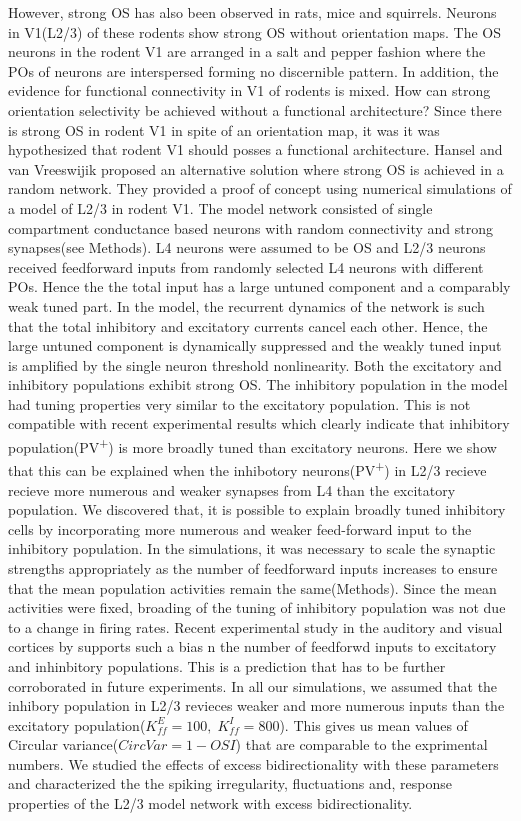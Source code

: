 However, strong OS has also been observed in rats, mice and squirrels. Neurons in V1(L2/3) of these rodents show strong OS without orientation maps. The OS neurons in the rodent V1 are arranged in a salt and pepper fashion where the POs of neurons are interspersed forming no discernible pattern. In addition, the evidence for functional connectivity in V1 of rodents is mixed. How can strong orientation selectivity be achieved without a functional architecture? Since there is strong OS in rodent V1 in spite of an orientation map, it was it was hypothesized that rodent V1 should posses a functional architecture. Hansel and van Vreeswijik \cite{Hansel2012} proposed an alternative solution where strong OS is achieved in a random network. They provided a proof of concept using numerical simulations of a model of L2/3 in rodent V1. The model network consisted of single compartment conductance based neurons with random connectivity and strong synapses(see Methods). L4 neurons were assumed to be OS and L2/3 neurons received feedforward inputs from randomly selected L4 neurons with different POs. Hence the the total input has a large untuned component and a comparably weak tuned part. In the model, the recurrent dynamics of the network is such that the total inhibitory and excitatory currents cancel each other. Hence, the large untuned component is dynamically suppressed and the weakly tuned input is amplified by the single neuron threshold nonlinearity. Both the excitatory and inhibitory populations exhibit strong OS. The inhibitory population in the model had tuning properties very similar to the excitatory population. This is not compatible with recent experimental results which clearly indicate that inhibitory population(PV\textsuperscript{+}) is more broadly tuned than excitatory neurons. Here we show that this can be explained when the inhibotory neurons(PV\textsuperscript{+}) in L2/3 recieve recieve more numerous and weaker synapses from L4 than the excitatory population.  We discovered that, it is possible to explain broadly tuned inhibitory cells by incorporating more numerous and weaker feed-forward input to the inhibitory population. In the simulations, it was necessary to scale the synaptic strengths appropriately as the number of feedforward inputs increases to ensure that the mean population activities remain the same(Methods). Since the mean activities were fixed, broading of the tuning of inhibitory population was not due to a change in firing rates. Recent experimental study in the auditory and visual cortices by \cite{} supports such a bias n the number of feedforwd inputs to excitatory and inhinbitory populations. This is a prediction that has to be further corroborated in future experiments. In all our simulations, we assumed that the inhibory population in L2/3 revieces weaker and more numerous inputs than the excitatory population($K_{ff}^{E} = 100, \; K_{ff}^{I} = 800$). This gives us mean values of Circular variance($CircVar = 1 - OSI$) that are comparable to the exprimental numbers. We studied the effects of excess bidirectionality with these parameters and characterized the the spiking irregularity, fluctuations and, response properties of the L2/3 model network with excess bidirectionality.  


